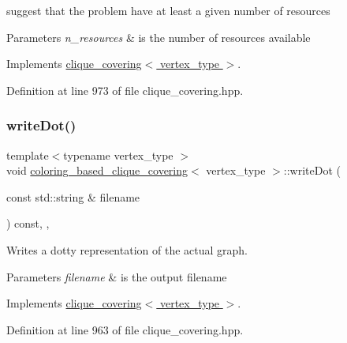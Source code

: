 suggest that the problem have at least a given number of resources 


\begin{DoxyParams}{Parameters}
{\em n\+\_\+resources} & is the number of resources available \\
\hline
\end{DoxyParams}


Implements \hyperlink{classclique__covering_aaf503ea280de45beb314149704414922}{clique\+\_\+covering$<$ vertex\+\_\+type $>$}.



Definition at line 973 of file clique\+\_\+covering.\+hpp.

\mbox{\label{classcoloring__based__clique__covering_a6dfe0da70979e9851a95d247b9847c32}} 
\subsubsection{\texorpdfstring{write\+Dot()}{writeDot()}}
{\footnotesize\ttfamily template$<$typename vertex\+\_\+type $>$ \\
void \hyperlink{classcoloring__based__clique__covering}{coloring\+\_\+based\+\_\+clique\+\_\+covering}$<$ vertex\+\_\+type $>$\+::write\+Dot (\begin{DoxyParamCaption}\item[{const std\+::string \&}]{filename }\end{DoxyParamCaption}) const\hspace{0.3cm}{\ttfamily [inline]}, {\ttfamily [override]}, {\ttfamily [virtual]}}



Writes a dotty representation of the actual graph. 


\begin{DoxyParams}{Parameters}
{\em filename} & is the output filename \\
\hline
\end{DoxyParams}


Implements \hyperlink{classclique__covering_a67c99c3f13f8a9400ae6e83d8bd31ba5}{clique\+\_\+covering$<$ vertex\+\_\+type $>$}.



Definition at line 963 of file clique\+\_\+covering.\+hpp.



